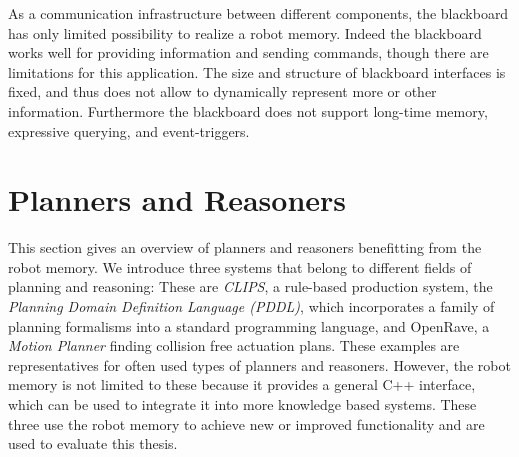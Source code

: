 As a communication infrastructure between different components, the
blackboard has only limited possibility to realize a robot memory.
Indeed the blackboard works well for providing information and
sending commands, though there are limitations for this
application. The size and structure of blackboard interfaces is fixed, and
thus does not allow to dynamically represent more or other information.
Furthermore the blackboard does not support long-time memory,
expressive querying, and event-triggers.

\section{Planners and Reasoners}
\label{sec:planners}
This section gives an overview of planners and reasoners benefitting
from the robot memory. We introduce three systems that belong to
different fields of planning and reasoning: These are \emph{CLIPS}, a
rule-based production system, the \emph{Planning Domain Definition
  Language (PDDL)}, which incorporates a family of planning formalisms
into a standard programming language, and OpenRave, a \emph{Motion
  Planner} finding collision free actuation plans.  These examples are
representatives for often used types of planners and
reasoners. However, the robot memory is not limited to these because
it provides a general C++ interface, which can be used to integrate it
into more knowledge based systems. These three use the robot memory
to achieve new or improved functionality and are used to evaluate this
thesis.


